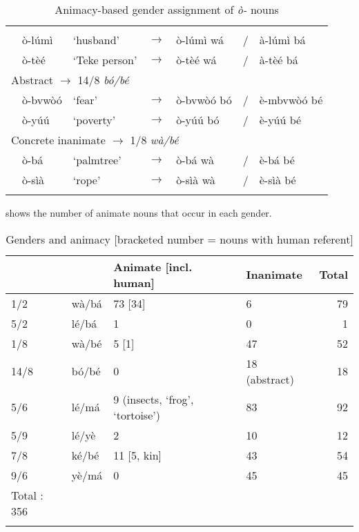 \documentclass[output=paper,,modfonts,nonflat]{langsci/langscibook}
\begin{document}
\begin{table}[!htbp]
\caption{Animacy-based gender assignment of \textit{ò-} nouns}
\label{table14}
\begin{small}
\begin{tabular}{l		l		l		l		l		l		l}
\lsptoprule	
	\multicolumn{7}{l}{Animate $\rightarrow$ 1/2 \textit{wà/bá}}											\\
	& ò-lúmì	&	‘husband’	&	$\rightarrow$	&	ò-lúmì wá	&	/	&	à-lúmì bá	\\
	& ò-tèé	&	‘Teke person’	&	$\rightarrow$	&	ò-tèé wá	&	/	&	à-tèé bá	\\ [0.2cm]
	\multicolumn{7}{l}{Abstract $\rightarrow$ 14/8 \textit{bó/bé}}											\\
	& ò-bvwòó	&	‘fear’	&	$\rightarrow$	&	ò-bvwòó bó	&	/	&	è-mbvwòó bé	\\
	& ò-yúú	&	‘poverty’	&	$\rightarrow$	&	ò-yúú bó	&	/	&	è-yúú bé	\\ [0.2cm]
	\multicolumn{7}{l}{Concrete inanimate $\rightarrow$ 1/8 \textit{wà/bé}}											\\
	& ò-bá	&	‘palmtree’	&	$\rightarrow$	&	ò-bá wà	&	/	&	è-bá bé	\\
	& ò-sìà	&	‘rope’	&	$\rightarrow$	&	ò-sìà wà	&	/	&	è-sìà bé	\\
  \lspbottomrule
\end{tabular}
\end{small}
\end{table}

 shows the number of animate nouns that occur in each gender.

\begin{table}[!htbp]
\caption{Genders and animacy [bracketed number = nouns with human referent]}
\label{table15}
\begin{small}
\begin{tabular}{llllr}
\lsptoprule	
	&		&	Animate [incl. human] 	&	Inanimate	&	Total	\\
\midrule									
1/2	&	wà/bá	&	\cellcolor{gray!60}73 [34]	&	6	&	79	\\
5/2	&	lé/bá	&	\cellcolor{gray!60}1	&	0	&	1	\\
1/8	&	wà/bé	&	5 [1]	&	\cellcolor{gray!60}47	&	52	\\
14/8	&	bó/bé	&	0	&	\cellcolor{gray!60}18 (abstract)	&	18	\\
5/6	&	lé/má	&	9 (insects, ‘frog’, ‘tortoise’)	&	\cellcolor{gray!60}83	&	92	\\
5/9	&	lé/yè	&	2	&	\cellcolor{gray!60}10	&	12	\\
7/8	&	ké/bé	&	11 [5, kin]	&	\cellcolor{gray!60}43	&	54	\\
9/6	&	yè/má	&	0	&	\cellcolor{gray!60}45	&	45	\\
						Total :		356	\\
\lspbottomrule
\end{tabular}
\end{small}
\end{table}
\end{document}
